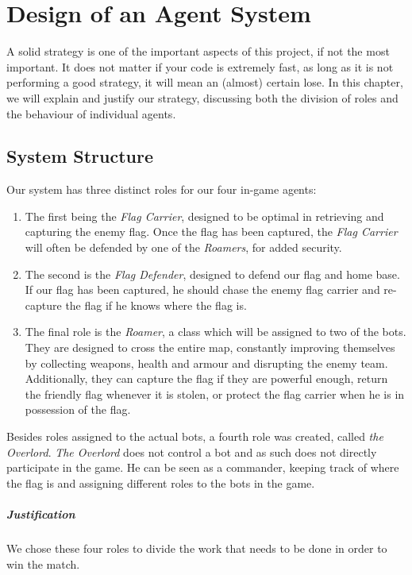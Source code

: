 \chapter{Design of an Agent System}

A solid strategy is one of the important aspects of this project, if not the most important. It does not matter if your code is extremely fast, as long as it is not performing a good strategy, it will mean an (almost) certain lose. In this chapter, we will explain and justify our strategy, discussing both the division of roles and the behaviour of individual agents.

\section{System Structure}
Our system has three distinct roles for our four in-game agents:

\begin{enumerate}
\item The first being the \emph{Flag Carrier}, designed to be optimal in retrieving and capturing the enemy flag. Once the flag has been captured, the \emph{ Flag Carrier} will often be defended by one of the \emph{Roamers}, for added security.

\item The second is the \emph{Flag Defender}, designed to defend our flag and home base. If our flag has been captured, he should chase the enemy flag carrier and re-capture the flag if he knows where the flag is. 

\item The final role is the \emph{Roamer}, a class which will be assigned to two of the bots. They are designed to cross the entire map, constantly improving themselves by collecting weapons, health and armour and disrupting the enemy team. Additionally, they can capture the flag if they are powerful enough, return the friendly flag whenever it is stolen, or protect the flag carrier when he is in possession of the flag.
\end{enumerate}

Besides roles assigned to the actual bots, a fourth role was created, called \emph{the Overlord}. \emph{The Overlord} does not control a bot and as such does not directly participate in the game. He can be seen as a commander, keeping track of where the flag is and assigning different roles to the bots in the game.\\

\paragraph{Justification}
We chose these four roles to divide the work that needs to be done in order to win the match.

